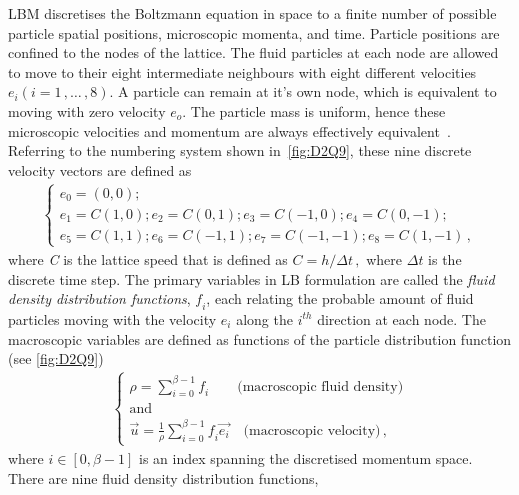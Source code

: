LBM discretises the Boltzmann equation in space to a finite 
number of possible particle spatial positions, microscopic 
momenta, and time. Particle positions are confined to the nodes 
of the lattice. The fluid particles at each node are allowed to 
move to their eight intermediate neighbours with eight 
different velocities $\mathit{e_i} (\mathit{i}=1\,,\dots\,,8)$. 
A particle can remain at it's own node, which is 
equivalent to moving with zero velocity $\mathit{e_o}$. The 
particle mass is uniform, hence these microscopic velocities 
and momentum are always effectively 
equivalent~\citep{Han2007a}. Referring to the numbering system 
shown in~\cref{fig:D2Q9}, these nine discrete velocity vectors 
are defined as
%
\begin{align} 
	\begin{cases}
	\mathit{e_0}=(0,0);\\
	\mathit{e_1}=\mathit{C}(1,0); \mathit{e_2}=\mathit{C}(0,1); 
	\mathit{e_3}=\mathit{C}(-1,0); \mathit{e_4}=\mathit{C}(0,-1); \\
	\mathit{e_5}=\mathit{C}(1,1); \mathit{e_6}=\mathit{C}(-1,1);  
	\mathit{e_7}=\mathit{C}(-1,-1); \mathit{e_8}=\mathit{C}(1,-1)\,, 
	\end{cases}
\end{align}
%
\noindent where \textit{C} is the lattice speed that is defined 
as $\mathit{C}=\mathit{h}/\Delta t \,,$ where $\Delta 
\mathit{t}$ is the discrete time step. The primary variables in 
LB formulation are called the \textit{fluid density 
distribution functions}, $\mathit{f_i}$, each relating the 
probable amount of fluid particles moving with the velocity 
$\mathit{e_i}$ along the $\mathit{i^{th}}$ direction at each 
node. The macroscopic variables are defined as functions of the 
particle distribution function (see \cref{fig:D2Q9})
%
\begin{align} 
	\label{eq:lbm_macroscopic}	
	\begin{cases}
	\rho = \sum\limits_{\mathit{i}=0}^{\beta - 1}{\mathit{f_i}} \qquad 
	\mbox{(macroscopic fluid density)} \\ 
	\mbox{and}\\
	\overrightarrow{\mathit{u}} = \frac{1}{\rho} 
	\sum\limits_{\mathit{i}=0}^{\beta 
	-1}{\mathit{f_i}\overrightarrow{\mathit{e_i}}} \quad \mbox{(macroscopic 
	velocity)}\,,
	\end{cases}	
\end{align} 
%
\noindent where $\mathit{i} \in [0, \beta -1]$ is an index 
spanning the discretised momentum space. There are nine fluid 
density distribution functions, 
